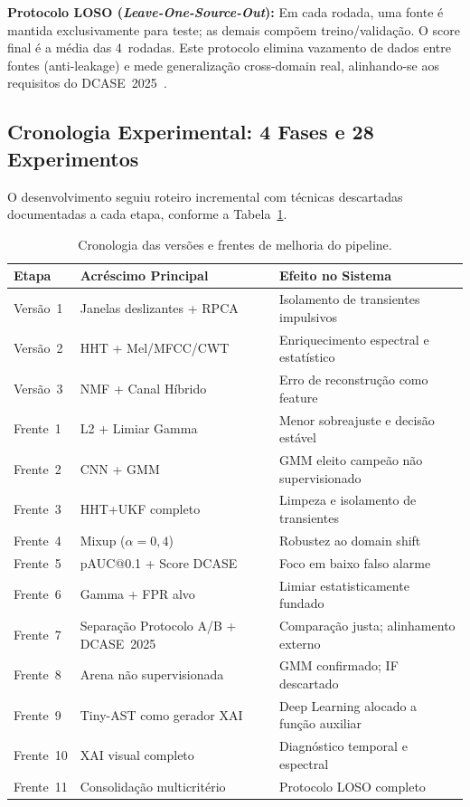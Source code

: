 \textbf{Protocolo LOSO (\textit{Leave-One-Source-Out}):} Em cada rodada, uma fonte é mantida
exclusivamente para teste; as demais compõem treino/validação. O score final é a média das 4~rodadas.
Este protocolo elimina vazamento de dados entre fontes (anti-leakage) e mede generalização cross-domain
real, alinhando-se aos requisitos do DCASE~2025~\cite{Harada2023}.

\subsection{Cronologia Experimental: 4 Fases e 28 Experimentos}

O desenvolvimento seguiu roteiro incremental com técnicas descartadas documentadas a cada etapa,
conforme a Tabela~\ref{tab:cronologia_frentes}.

\begin{table}[H]
\centering
\footnotesize
\begin{tabularx}{\columnwidth}{@{} l X X @{}}
\toprule
\textbf{Etapa} & \textbf{Acréscimo Principal} & \textbf{Efeito no Sistema} \\ \midrule
Versão~1 & Janelas deslizantes + RPCA & Isolamento de transientes impulsivos \\
Versão~2 & HHT + Mel/MFCC/CWT & Enriquecimento espectral e estatístico \\
Versão~3 & NMF + Canal Híbrido & Erro de reconstrução como feature \\ \midrule
Frente~1 & L2 + Limiar Gamma & Menor sobreajuste e decisão estável \\
Frente~2 & CNN + GMM & GMM eleito campeão não supervisionado \\
Frente~3 & HHT+UKF completo & Limpeza e isolamento de transientes \\
Frente~4 & Mixup ($\alpha{=}0{,}4$) & Robustez ao domain shift \\
Frente~5 & pAUC@0.1 + Score DCASE & Foco em baixo falso alarme \\
Frente~6 & Gamma + FPR alvo & Limiar estatisticamente fundado \\
Frente~7 & Separação Protocolo A/B + DCASE~2025 & Comparação justa; alinhamento externo \\
Frente~8 & Arena não supervisionada & GMM confirmado; IF descartado \\
Frente~9 & Tiny-AST como gerador XAI & Deep Learning alocado a função auxiliar \\
Frente~10 & XAI visual completo & Diagnóstico temporal e espectral \\
Frente~11 & Consolidação multicritério & Protocolo LOSO completo \\ \bottomrule
\end{tabularx}
\caption{Cronologia das versões e frentes de melhoria do pipeline.}
\label{tab:cronologia_frentes}
\end{table}

